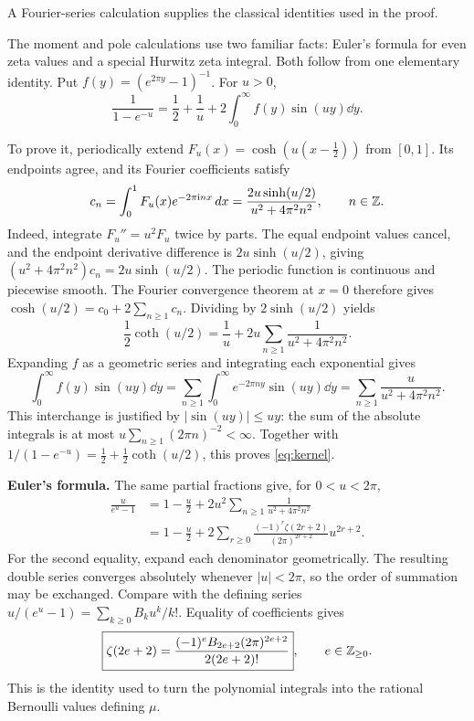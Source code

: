 \newpage
{}
{A Fourier-series calculation supplies the classical identities used in the proof.}

The moment and pole calculations use two familiar facts: Euler's formula
for even zeta values and a special Hurwitz zeta integral. Both follow from
one elementary identity. Put $f(y)=(e^{2\pi y}-1)^{-1}$. For $u>0$,
\begin{equation}\label{eq:kernel}
 \frac1{1-e^{-u}}=\frac12+\frac1u
       +2\int_0^\infty f(y)\sin(uy)\dd y.
\end{equation}

To prove it, periodically extend
$F_u(x)=\cosh(u(x-\tfrac12))$ from $[0,1]$. Its endpoints agree,
and its Fourier coefficients satisfy
\[
 c_n=\int_0^1 F_u(x)e^{-2\pi\mathrm i nx}\,d x
     =\frac{2u\sinh(u/2)}{u^2+4\pi^2n^2},\qquad n\in\mathbb Z.
\]
Indeed, integrate $F_u''=u^2F_u$ twice by parts. The equal endpoint
values cancel, and the endpoint derivative difference is
$2u\sinh(u/2)$, giving
$(u^2+4\pi^2n^2)c_n=2u\sinh(u/2)$.
The periodic function is continuous and piecewise smooth. The Fourier
convergence theorem at $x=0$ therefore gives
$\cosh(u/2)=c_0+2\sum_{n\geq1}c_n$. Dividing by $2\sinh(u/2)$ yields
\[
 \frac12\coth(u/2)=\frac1u
      +2u\sum_{n\geq1}\frac1{u^2+4\pi^2n^2}.
\]
Expanding $f$ as a geometric series and integrating each exponential gives
\[
 \int_0^\infty f(y)\sin(uy)\dd y
 =\sum_{n\geq1}\int_0^\infty e^{-2\pi ny}\sin(uy)\dd y
 =\sum_{n\geq1}\frac{u}{u^2+4\pi^2n^2}.
\]
This interchange is justified by $|\sin(uy)|\leq uy$:
the sum of the absolute integrals is at most
$u\sum_{n\geq1}(2\pi n)^{-2}<\infty$.
Together with $1/(1-e^{-u})=\tfrac12+\tfrac12\coth(u/2)$,
this proves \eqref{eq:kernel}.

\textbf{Euler's formula.}
The same partial fractions give, for $0<u<2\pi$,
\begin{align*}
 \frac{u}{e^u-1}
 &=1-\frac u2+2u^2\sum_{n\geq1}\frac1{u^2+4\pi^2n^2}\\
 &=1-\frac u2+
   2\sum_{r\geq0}\frac{(-1)^r\zeta(2r+2)}{(2\pi)^{2r+2}}u^{2r+2}.
\end{align*}
For the second equality, expand each denominator geometrically. The
resulting double series converges absolutely whenever $|u|<2\pi$, so
the order of summation may be exchanged. Compare with the defining
series $u/(e^u-1)=\sum_{k\geq0}B_ku^k/k!$. Equality of coefficients gives
\[
 \boxed{\zeta(2e+2)=
 \frac{(-1)^eB_{2e+2}(2\pi)^{2e+2}}{2(2e+2)!}},
 \qquad e\in\mathbb Z_{\geq0}.
\]
This is the identity used to turn the polynomial integrals into the
rational Bernoulli values defining $\mu$.

